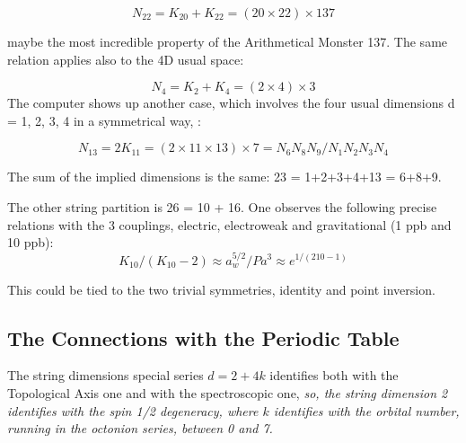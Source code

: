 \documentclass[a4paper,9pt]{article}
\newcounter{row}
\begin{document}
\begin{equation}\label{Eq42}
 N_{22}  = K_{20} + K_{22} = (20\times 22) \times 137
 \end{equation}

maybe the most incredible property of the Arithmetical Monster 137. The same relation applies also to the 4D usual space:

\begin{equation}\label{Eq43}
 N_4  = K_2 + K_4 = (2\times 4) \times 3
 \end{equation}
%
The computer shows up another case, which involves the four usual dimensions d = 1, 2, 3, 4 in a symmetrical way, :

\begin{equation}\label{Eq44}
 N_{13}  = 2K_{11} = (2\times 11 \times 13)\times 7 = N_6N_8N_9/N_1N_2N_3N_4
 \end{equation}

The sum of the implied dimensions is the same: 23 = 1+2+3+4+13 = 6+8+9. 

The other string partition is 26 = 10 + 16. One observes the following precise relations with the 3 couplings, electric, electroweak and gravitational (1 ppb and 10 ppb):
\begin{equation}\label{Eq45}
K_{10}/(K_{10}-2) \approx a_w^{5/2}/ P a^3   \approx e^{1/(210-1)}
 \end{equation}

This could be tied to the two trivial symmetries, identity and point inversion. 
 






 
\subsection{The Connections with the Periodic Table}

The string dimensions special series $d= 2+4k$ identifies both with the Topological Axis one and with the spectroscopic one, \textit {so, the string dimension 2 identifies with the spin 1/2 degeneracy, where $k$ identifies with the orbital number, running in the octonion series, between 0 and 7.} 
\end{document}
